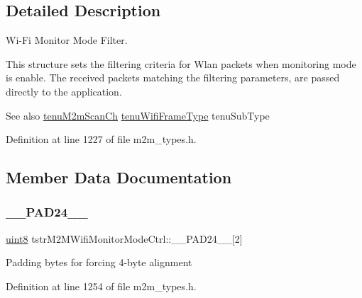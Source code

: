 \subsection{Detailed Description}
Wi-\/\+Fi Monitor Mode Filter. 

This structure sets the filtering criteria for Wlan packets when monitoring mode is enable. The received packets matching the filtering parameters, are passed directly to the application.

\begin{DoxySeeAlso}{See also}
\hyperlink{group__WlanEnums_ga2a91dd671e2672dba1a7ed45230f3a99}{tenu\+M2m\+Scan\+Ch} \hyperlink{group__WlanEnums_ga593eb9b713b71fcc9cae6e81393b40d9}{tenu\+Wifi\+Frame\+Type} tenu\+Sub\+Type 
\end{DoxySeeAlso}


Definition at line 1227 of file m2m\+\_\+types.\+h.



\subsection{Member Data Documentation}
\mbox{\label{structtstrM2MWifiMonitorModeCtrl_ae87e7784d1fd54728cb47df66193a59f}} 
\subsubsection{\texorpdfstring{\+\_\+\+\_\+\+P\+A\+D24\+\_\+\+\_\+}{\_\_PAD24\_\_}}
{\footnotesize\ttfamily \hyperlink{group__DataT_ga4df709a77647e870bbf1d955b8edc9a6}{uint8} tstr\+M2\+M\+Wifi\+Monitor\+Mode\+Ctrl\+::\+\_\+\+\_\+\+P\+A\+D24\+\_\+\+\_\+\mbox{[}2\mbox{]}}

Padding bytes for forcing 4-\/byte alignment 

Definition at line 1254 of file m2m\+\_\+types.\+h.

\mbox{\label{structtstrM2MWifiMonitorModeCtrl_a306c03fea20a6628d37ce2e9e03370c6}} 
